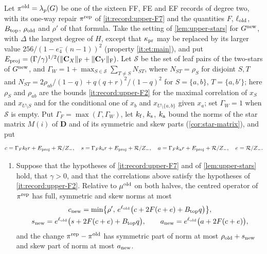 \begin{proposition}\label{prop:forest-records}
Let $\pi^{\rm old}=\lambda_p(G)$ be one of the sixteen FF, FE and EF records of
degree two, with its one-way repair $\pi^{\rm rep}$ of \ref{it:record:upper-F7}
and the quantities $F$, $\ell_{\rm old}$, $B_{\rm top}$, $\rho_{\rm old}$ and
$\rho'$ of that formula. Take the setting of \cref{lem:upper-stars} for
$G^{\rm new}$, with $\Delta$ the largest degree of $H$, except that
$\kappa_{\rm pr}$ may be replaced by its larger value $256/(1-e^-_4(n-1))^2$
(property \ref{it:et:main}), and put
$E_{\rm proj}=(\Gamma/\gamma)^{1/2}(\|\mathbf C_X\|_{\rm F}+\|\mathbf C_Y\|_{\rm F})$.
Let $\mathcal S$ be the set of leaf pairs of the two-stars of $G^{\rm new}$, and
$\Gamma_W=1+\max_{S\in\mathcal S}\sum_{T\ne S}N_{ST}$, where $N_{ST}=\rho_S$ for
disjoint $S,T$ and $N_{ST}=2\rho_{ab}/(1-q)+q(q+r)^2/(1-q)^2$ for $S=\{a,b\}$,
$T=\{a,b'\}$; here $\rho_S$ and $\rho_{ab}$ are the bounds \ref{it:record:upper-F2}
for the maximal correlation of $x_S$ and $x_{U\setminus S}$ and for the
conditional one of $x_b$ and $x_{U\setminus\{a,b\}}$ given $x_a$;
set $\Gamma_W=1$ when $\mathcal S$ is empty. Put
$\Gamma_F=\max(\Gamma,\Gamma_W)$, let $k_{\rm f}$, $k_{\rm s}$, $k_{\rm a}$ bound
the norms of the star matrix $M(i)$ of $\mathbf D$ and of its symmetric and skew
parts (\cref{cor:star-matrix}), and put
\[
 c=\frac{\Gamma_Fk_{\rm f}r+E_{\rm proj}+\mathcal R}{Z_-},\quad
 s=\frac{\Gamma_Fk_{\rm s}r+E_{\rm proj}+\mathcal R}{Z_-},\quad
 a=\frac{\Gamma_Fk_{\rm a}r+E_{\rm proj}+\mathcal R}{Z_-},\quad
 e=\frac{\mathcal R}{Z_-}.
\]
\begin{enumerate}[label=(\alph*)]
\item Suppose that the hypotheses of \ref{it:record:upper-F7} and of
 \cref{lem:upper-stars} hold, that $\gamma>0$, and that the correlations above
 satisfy the hypotheses of \ref{it:record:upper-F2}. Relative to $\mu^{\rm old}$
 on both halves, the centred operator of $\pi^{\rm rep}$ has full, symmetric and
 skew norms at most
 \begin{gather*}
  c_{\rm new}=\min\bigl\{\rho',\,e^{\ell_{\rm old}}\bigl(c+2F(c+e)+B_{\rm top}q\bigr)\bigr\},\\
  s_{\rm new}=e^{\ell_{\rm old}}\bigl(s+2F(c+e)+B_{\rm top}q\bigr),\qquad
  a_{\rm new}=e^{\ell_{\rm old}}\bigl(a+2F(c+e)\bigr),
 \end{gather*}
 and the change $\pi^{\rm rep}-\pi^{\rm old}$ has symmetric part of norm at most
 $\rho_{\rm old}+s_{\rm new}$ and skew part of norm at most $a_{\rm new}$.

\end{enumerate}
\end{proposition}
